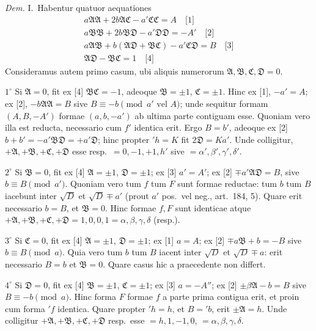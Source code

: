\documentclass[12pt,a4paper]{article}
\theoremstyle{plain}
\theoremstyle{definition}
\theoremstyle{remark}
\begin{document}
\textit{Dem.} I.\ Habentur quatuor aequationes
\begin{gather*}
a\mathfrak{A}\mathfrak{A}+2b\mathfrak{A}\mathfrak{C}-a'\mathfrak{C}\mathfrak{C}=A\quad\text{[1]}\\
a\mathfrak{B}\mathfrak{B}+2b\mathfrak{B}\mathfrak{D}-a'\mathfrak{D}\mathfrak{D}=-A'\quad\text{[2]}\\
a\mathfrak{A}\mathfrak{B}+b(\mathfrak{A}\mathfrak{D}+\mathfrak{B}\mathfrak{C})-a'\mathfrak{C}\mathfrak{D}=B\quad\text{[3]}\\
\mathfrak{A}\mathfrak{D}-\mathfrak{B}\mathfrak{C}=1\quad\text{[4]}
\end{gather*}
Consideramus autem primo casum, ubi aliquis numerorum $\mathfrak{A},\mathfrak{B},\mathfrak{C},\mathfrak{D}=0$.

$1^\circ$ Si $\mathfrak{A}=0$, fit ex [4] $\mathfrak{B}\mathfrak{C}=-1$, adeoque $\mathfrak{B}=\pm 1$, $\mathfrak{C}=\pm 1$. Hinc ex [1], $-a'=A$; ex [2], $-b\mathfrak{A}\mathfrak{A}=B$ sive $B\equiv -b\pmod{a'\text{ vel }A}$; unde sequitur formam $(A,B,-A')$ formae $(a,b,-a')$ ab ultima parte contiguam esse. Quoniam vero illa est reducta, necessario cum $f'$ identica erit. Ergo $B=b'$, adeoque ex [2] $b+b'=-a'\mathfrak{B}\mathfrak{D}=+a'\mathfrak{D}$; hinc propter $'h=K$ fit $2\mathfrak{D}=K a'$. Unde colligitur, $+\mathfrak{A},+\mathfrak{B},+\mathfrak{C},+\mathfrak{D}$ esse resp.\ $=0,-1,+1,h'$ sive $=\alpha',\beta',\gamma',\delta'$.

$2^\circ$ Si $\mathfrak{B}=0$, fit ex [4] $\mathfrak{A}=\pm 1$, $\mathfrak{D}=\pm 1$; ex [3] $a'=A'$; ex [2] $\mp a'\mathfrak{A}\mathfrak{D}=B$, sive $b\equiv B\pmod{a'}$. Quoniam vero tum $f$ tum $F$ sunt formae reductae: tum $b$ tum $B$ iacebunt inter $\sqrt{D}$ et $\sqrt{D}\mp a'$ (prout $a'$ pos.\ vel neg., art.\ 184, 5). Quare erit necessario $b=B$, et $\mathfrak{B}=0$. Hinc formae $f,F$ sunt identicae atque $+\mathfrak{A},+\mathfrak{B},+\mathfrak{C},+\mathfrak{D}=1,0,0,1=\alpha,\beta,\gamma,\delta$ (resp.).

$3^\circ$ Si $\mathfrak{C}=0$, fit ex [4] $\mathfrak{A}=\pm 1$, $\mathfrak{D}=\pm 1$; ex [1] $a=A$; ex [2] $\mp a\mathfrak{B}+b=-B$ sive $b\equiv B\pmod{a}$. Quia vero tum $b$ tum $B$ iacent inter $\sqrt{D}$ et $\sqrt{D}\mp a$: erit necessario $B=b$ et $\mathfrak{B}=0$. Quare casus hic a praecedente non differt.

$4^\circ$ Si $\mathfrak{D}=0$, fit ex [4] $\mathfrak{B}=\pm 1$, $\mathfrak{C}=\pm 1$; ex [3] $a=-A''$; ex [2] $\pm\beta\mathfrak{A}-b=B$ sive $B\equiv -b\pmod{a}$. Hinc forma $F$ formae $f$ a parte prima contigua erit, et proin cum forma $'f$ identica. Quare propter $'h=h$, et $B='b$, erit $\pm\mathfrak{A}=h$. Unde colligitur $+\mathfrak{A},+\mathfrak{B},+\mathfrak{C},+\mathfrak{D}$ resp.\ esse $=h,1,-1,0$, $=\alpha,\beta,\gamma,\delta$.
\end{document}
